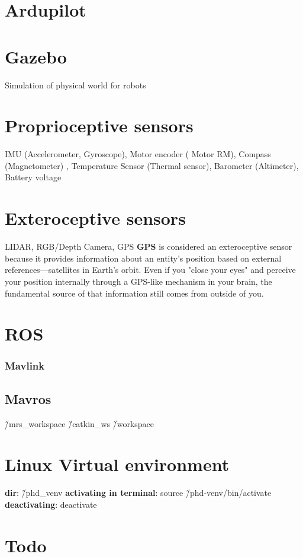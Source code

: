     \section{Ardupilot}

\section{Gazebo}
Simulation of physical world for robots


\section{Proprioceptive sensors} IMU (Accelerometer, Gyroscope), Motor encoder (	Motor RM), Compass (Magnetometer) , Temperature Sensor (Thermal sensor), Barometer (Altimeter), Battery voltage

\section{Exteroceptive sensors} LIDAR, RGB/Depth Camera, GPS
    \textbf{GPS} is considered an exteroceptive sensor because it provides information about an entity’s position based on external references—satellites in Earth's orbit. Even if you "close your eyes" and perceive your position internally through a GPS-like mechanism in your brain, the fundamental source of that information still comes from outside of you.

\section{ROS}
    \subsubsection{Mavlink}
    \subsection{Mavros}
        \~/mrs_workspace
        \~/catkin_ws
        \~/workspace

\section{Linux Virtual environment}
\textbf{dir}: \~/phd_venv
\textbf{activating in terminal}: source \~/phd-venv/bin/activate
\textbf{deactivating}: deactivate


\section{Todo}
